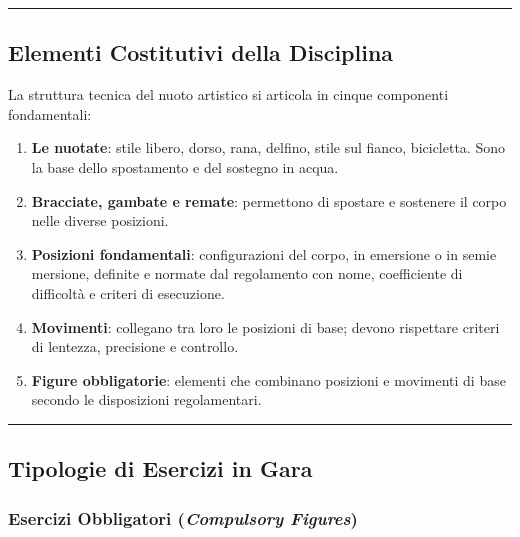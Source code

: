 \documentclass[a4paper,11pt]{article}
\providecommand{\tightlist}{%
  \setlength{\itemsep}{0pt}\setlength{\parskip}{0pt}}
\begin{document}
\begin{center}\rule{0.5\linewidth}{0.5pt}\end{center}

\subsection{Elementi Costitutivi della
      Disciplina}\label{elementi-costitutivi-della-disciplina}

La struttura tecnica del nuoto artistico si articola in cinque
componenti fondamentali:

\begin{enumerate}
      \tightlist
      \item
            \textbf{Le nuotate}: stile libero, dorso, rana, delfino, stile sul
            fianco, bicicletta. Sono la base dello spostamento e del sostegno in
            acqua.
      \item
            \textbf{Bracciate, gambate e remate}: permettono di spostare e
            sostenere il corpo nelle diverse posizioni.
      \item
            \textbf{Posizioni fondamentali}: configurazioni del corpo, in
            emersione o in semie mersione, definite e normate dal regolamento con
            nome, coefficiente di difficoltà e criteri di esecuzione.
      \item
            \textbf{Movimenti}: collegano tra loro le posizioni di base; devono
            rispettare criteri di lentezza, precisione e controllo.
      \item
            \textbf{Figure obbligatorie}: elementi che combinano posizioni e
            movimenti di base secondo le disposizioni regolamentari.
\end{enumerate}

\begin{center}\rule{0.5\linewidth}{0.5pt}\end{center}

\subsection{Tipologie di Esercizi in
      Gara}\label{tipologie-di-esercizi-in-gara}

\subsubsection{\texorpdfstring{Esercizi Obbligatori (\emph{Compulsory
                  Figures})}{Esercizi Obbligatori (Compulsory Figures)}}\label{esercizi-obbligatori-compulsory-figures}
\end{document}

